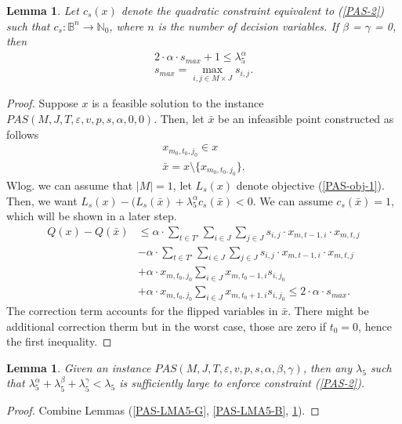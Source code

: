 \documentclass[12pt]{article}
\newtheorem{lemma}[theorem]{Lemma}
\begin{document}
\begin{lemma}\label{PAS-LMA5-A}
Let $c_s(x)$ denote the quadratic constraint equivalent to (\ref{PAS-2}) such that $c_s : \mathbb{B}^n \rightarrow \mathbb{N}_0$, where $n$ is the number of decision variables.
If $\beta$ = $\gamma$ = 0, then 
\begin{gather}
2 \cdot \alpha\cdot s_{max} + 1 \leq \lambda_5^{\alpha} \\
s_{max} = \max_{i, j \in M \times J} s_{i, j}.
\end{gather}
\end{lemma}
\begin{proof}
Suppose $x$ is a feasible solution to the instance $PAS(M, J, T, \varepsilon, v, p, s, \alpha, 0, 0)$. 
Then, let $\bar{x}$ be an infeasible point constructed as follows
\begin{gather*}
x_{m_0, t_0,j_0} \in x \\
\bar{x} = x \setminus \{x_{m_0, t_0,j_0}\}.
\end{gather*}
Wlog. we can assume that $|M| = 1$, let $L_s(x)$ denote objective (\ref{PAS-obj-1}).
Then, we want $L_s(x) - (L_s(\bar{x}) + \lambda^{\alpha}_5 c_s(\bar{x}) < 0$.
We can assume $c_s(\bar{x}) = 1$, which will be shown in a later step.
\begin{align*}
Q(x) - Q(\bar{x}) &\leq \alpha \cdot  \sum_{t \in T'} \sum_{i \in J}\sum_{j \in J} s_{i,j} \cdot x_{m, t-1, i} \cdot x_{m, t, j} \\ 
&- \alpha \cdot  \sum_{t \in T'} \sum_{i \in J}\sum_{j \in J} s_{i,j} \cdot x_{m, t-1, i} \cdot x_{m, t, j} \\
&+ \alpha  \cdot x_{m, t_0, j_0}\sum_{i \in J}  x_{m, t_0-1, i} s_{i, j_0}  \\
&+  \alpha \cdot x_{m, t_0, j_0}\sum_{i \in J}  x_{m, t_0+1, i} s_{i, j_0}
\leq 2 \cdot \alpha \cdot s_{max}.
\end{align*}
The correction term accounts for the flipped variables in $\bar{x}$. 
There might be additional correction therm but in the worst case, those are zero if $t_0 = 0$, hence the first inequality.
\end{proof}

\begin{lemma}
Given an instance  $PAS(M, J, T, \varepsilon, v, p, s, \alpha, \beta, \gamma )$, then any $ \lambda_5$ such that $\lambda_5^{\alpha} + \lambda_5^{\beta} + \lambda_5^{\gamma} < \lambda_5$ is sufficiently large to enforce constraint (\ref{PAS-2}).
\end{lemma}
\begin{proof}
Combine Lemmas (\ref{PAS-LMA5-G}, \ref{PAS-LMA5-B}, \ref{PAS-LMA5-A}).
\end{proof}
\end{document}

